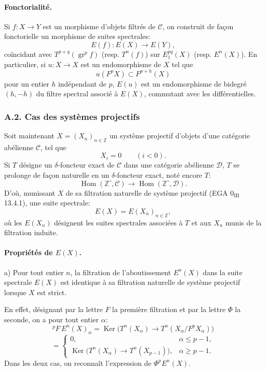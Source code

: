 \documentclass[11pt]{article}
\DeclareMathOperator{\Hom}{Hom}
\providecommand{\Ker}{\operatorname{Ker}}
\providecommand{\gr}{\operatorname{gr}}
\providecommand{\Hom}{\operatorname{Hom}}
\providecommand{\Ker}{\operatorname{Ker}}
\providecommand{\gr}{\operatorname{gr}}
\providecommand{\gr}{\operatorname{gr}}
\providecommand{\Ker}{\operatorname{Ker}}
\begin{document}
\paragraph{Fonctorialité.}
Si \(f:X\to Y\) est un morphisme d'objets filtrés de \(\mathcal C\), on construit de façon fonctorielle un morphisme de suites spectrales:
\[
E(f):E(X)\longrightarrow E(Y),
\]
coïncidant avec \(T^{p+q}(\gr^p f)\) (resp. \(T^n(f)\)) sur \(E_1^{pq}(X)\) (resp. \(E^n(X)\)). En particulier, si \(u:X\to X\) est un endomorphisme de \(X\) tel que
\[
u(F^pX)\subset F^{p+h}(X)
\]
pour un entier \(h\) indépendant de \(p\), \(E(u)\) est un endomorphisme de bidegré \((h,-h)\) du filtre spectral associé à \(E(X)\), commutant avec les différentielles.

\subsubsection*{A.2. Cas des systèmes projectifs}
Soit maintenant \(X=(X_n)_{n\in\mathbb Z}\) un système projectif d'objets d'une catégorie abélienne \(\mathcal C\), tel que
\[
X_i=0\qquad(i<0).
\]
Si \(T\) désigne un \(\delta\)-foncteur exact de \(\mathcal C\) dans une catégorie abélienne \(\mathcal D\), \(T\) se prolonge de façon naturelle en un \(\delta\)-foncteur exact, noté encore \(T\):
\[
\Hom(\mathbb Z^\circ,\mathcal C)\longrightarrow \Hom(\mathbb Z^\circ,\mathcal D).
\]
D'où, munissant \(X\) de sa filtration naturelle de système projectif (EGA \(0_{\mathrm{III}}\) 13.4.1), une suite spectrale:
\[
E(X)=E(X_n)_{n\in\mathbb Z},
\]
où les \(E(X_n)\) désignent les suites spectrales associées à \(T\) et aux \(X_n\) munis de la filtration induite.

\paragraph{Propriétés de \(E(X)\).}
a) Pour tout entier \(n\), la filtration de l'aboutissement \(E^n(X)\) dans la suite spectrale \(E(X)\) est identique à sa filtration naturelle de système projectif lorsque \(X\) est strict.

En effet, désignant par la lettre \(F\) la première filtration et par la lettre \(\Phi\) la seconde, on a pour tout entier \(\alpha\):
\[
{}^pF\,E^n(X)_\alpha
=\Ker\bigl(T^n(X_\alpha)\longrightarrow T^n(X_\alpha/F^pX_\alpha)\bigr)
\]
\[
=
\begin{cases}
0,& \alpha\le p-1,\\
\Ker\bigl(T^n(X_\alpha)\longrightarrow T^n(X_{p-1})\bigr),& \alpha\ge p-1.
\end{cases}
\]
Dans les deux cas, on reconnaît l'expression de \(\Phi^pE^n(X)\).
\end{document}
